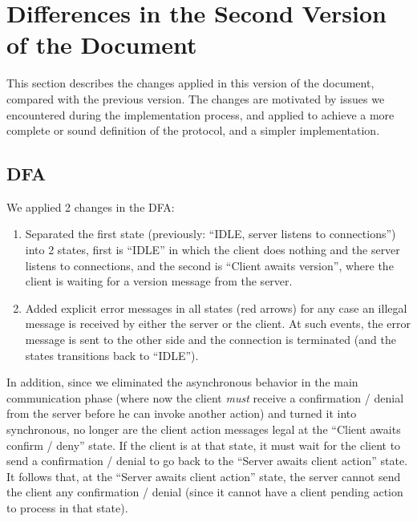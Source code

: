 \section{Differences in the Second Version of the Document}
\label{sec:diff}

This section describes the changes applied in this version of the document, compared with the previous version. The changes are motivated by issues we encountered during the implementation process, and applied to achieve a more complete or sound definition of the protocol, and a simpler implementation.

\subsection{DFA}
We applied 2 changes in the DFA:
\begin{enumerate}
\item Separated the first state (previously: ``IDLE, server listens to connections'') into 2 states, first is ``IDLE'' in which the client does nothing and the server listens to connections, and the second is ``Client awaits version'', where the client is waiting for a version message from the server.
\item Added explicit error messages in all states (red arrows) for any case an illegal message is received by either the server or the client. At such events, the error message is sent to the other side and the connection is terminated (and the states transitions back to ``IDLE'').
\end{enumerate}

In addition, since we eliminated the asynchronous behavior in the main communication phase (where now the client {\em must} receive a confirmation / denial from the server before he can invoke another action) and turned it into synchronous, no longer are the client action messages legal at the ``Client awaits confirm / deny'' state. If the client is at that state, it must wait for the client to send a confirmation / denial to go back to the ``Server awaits client action'' state. It follows that, at the ``Server awaits client action'' state, the server cannot send the client any confirmation / denial (since it cannot have a client pending action to process in that state).
